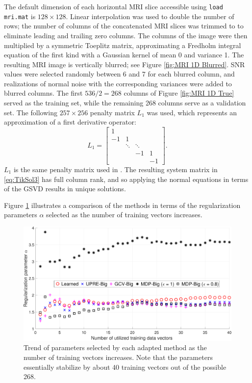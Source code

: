 \documentclass[12pt]{article}
\newcommand{\regparam}{\alpha}
\begin{document}
\noindent The default dimension of each horizontal MRI slice accessible using \texttt{load mri.mat} is $128 \times 128$. Linear interpolation was used to double the number of rows; the number of columns of the concatenated MRI slices was trimmed to to eliminate leading and trailing zero columns. The columns of the image were then multiplied by a symmetric Toeplitz matrix, approximating a Fredholm integral equation of the first kind with a Gaussian kernel of mean 0 and variance 1. The resulting MRI image is vertically blurred; see Figure \ref{fig:MRI 1D Blurred}. SNR values were selected randomly between 6 and 7 for each blurred column, and realizations of normal noise with the corresponding variances were added to blurred columns. The first $536/2 = 268$ columns of Figure \ref{fig:MRI 1D True} served as the training set, while the remaining 268 columns serve as a validation set.  The following $257 \times 256$ penalty matrix $L_1$ was used, which represents an approximation of a first derivative operator:
\[L_1 = \begin{bmatrix}
1 & & & \\
-1 & 1 & &  \\
 & \ddots &  \ddots & \\
 & & -1 & 1 \\
 & & & -1
\end{bmatrix}.\]
$L_1$ is the same penalty matrix used in \cite{ChungEspanol2017}. The resulting system matrix in \eqref{eq:TikSol3} has full column rank, and so applying the normal equations in terms of the GSVD results in unique solutions. \par 
Figure \ref{fig:Parameters 1D MRI} illustrates a comparison of the methods in terms of the regularization parameters $\regparam$ selected as the number of training vectors increases. 

\begin{figure}[ht]
\includegraphics[scale=0.36]{Figures/Parameters1D_mri}
\caption{Trend of parameters selected by each adapted method as the number of training vectors increases. Note that the parameters essentially stabilize by about 40 training vectors out of the possible 268.}
\label{fig:Parameters 1D MRI}
\end{figure}
\end{document}
